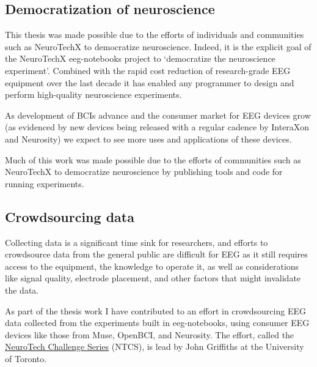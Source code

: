 

\subsection{Democratization of neuroscience}

    This thesis was made possible due to the efforts of individuals and communities such as NeuroTechX to democratize neuroscience. Indeed, it is the explicit goal of the NeuroTechX eeg-notebooks project to `democratize the neuroscience experiment'. Combined with the rapid cost reduction of research-grade EEG equipment over the last decade it has enabled any programmer to design and perform high-quality neuroscience experiments.

    As development of BCIs advance and the consumer market for EEG devices grow (as evidenced by new devices being released with a regular cadence by InteraXon and Neurosity) we expect to see more uses and applications of these devices.

    Much of this work was made possible due to the efforts of communities such as NeuroTechX to democratize neuroscience by publishing tools and code for running experiments.

\subsection{Crowdsourcing data}

    Collecting data is a significant time sink for researchers, and efforts to crowdsource data from the general public are difficult for EEG as it still requires access to the equipment, the knowledge to operate it, as well as considerations like signal quality, electrode placement, and other factors that might invalidate the data.

    As part of the thesis work I have contributed to an effort in crowdsourcing EEG data collected from the experiments built in eeg-notebooks, using consumer EEG devices like those from Muse, OpenBCI, and Neurosity\@. The effort, called the \href{https://neurotech-challenge.com/}{NeuroTech Challenge Series} (NTCS), is lead by John Griffiths at the University of Toronto.

